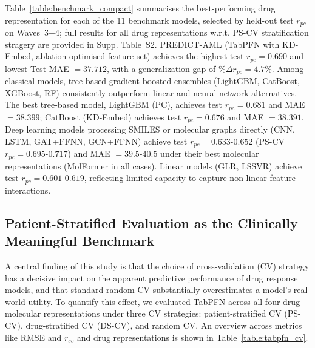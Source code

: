 \documentclass[pdflatex,sn-mathphys-num]{sn-jnl}
\theoremstyle{thmstyleone}
\theoremstyle{thmstyletwo}
\theoremstyle{thmstylethree}
\begin{document}
Table~\ref{table:benchmark_compact} summarises the best-performing drug representation for each of the 11 benchmark models, selected by held-out test $r_{pc}$ on Waves~3+4; full results for all drug representations w.r.t. PS-CV stratification stragery are provided in Supp. Table~S2. PREDICT-AML (TabPFN with KD-Embed, ablation-optimised feature set) achieves the highest test $r_{pc} = 0.690$ and lowest Test MAE $= 37.712$, with a generalization gap of $\%\Delta r_{pc} = 4.7\%$. Among classical models, tree-based gradient-boosted ensembles (LightGBM, CatBoost, XGBoost, RF) consistently outperform linear and neural-network alternatives. The best tree-based model, LightGBM (PC), achieves test $r_{pc} = 0.681$ and MAE $= 38.399$; CatBoost (KD-Embed) achieves test $r_{pc} = 0.676$ and MAE $= 38.391$. Deep learning models processing SMILES or molecular graphs directly (CNN, LSTM, GAT+FFNN, GCN+FFNN) achieve test $r_{pc} = 0.633$-$0.652$ (PS-CV $r_{pc} = 0.695$-$0.717$) and MAE $= 39.5$-$40.5$ under their best molecular representations (MolFormer in all cases). Linear models (GLR, LSSVR) achieve test $r_{pc} = 0.601$-$0.619$, reflecting limited capacity to capture non-linear feature interactions. %

\subsection{Patient-Stratified Evaluation as the Clinically Meaningful Benchmark}\label{sec3.2}
A central finding of this study is that the choice of cross-validation (CV) strategy has a decisive impact on the apparent predictive performance of drug response models, and that standard random CV substantially overestimates a model's real-world utility. To quantify this effect, we evaluated TabPFN across all four drug molecular representations under three CV strategies: patient-stratified CV (PS-CV), drug-stratified CV (DS-CV), and random CV. An overview across metrics like RMSE and $r_{sc}$ and drug representations is shown in Table~\ref{table:tabpfn_cv}.
\end{document}

